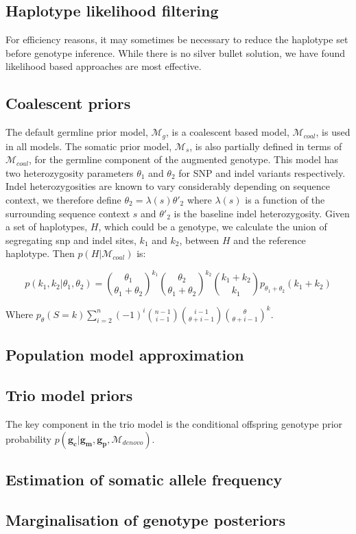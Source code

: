 \documentclass[notitlepage, twocolumn]{article}
\begin{document}
\subsection*{Haplotype likelihood filtering}

For efficiency reasons, it may sometimes be necessary to reduce the haplotype set before genotype inference. While there is no silver bullet solution, we have found likelihood based approaches are most effective.

\subsection*{Coalescent priors}

The default germline prior model, $\mathcal{M}_{g}$, is a coalescent based model, $\mathcal{M}_{coal}$, is used in all models. The somatic prior model, $\mathcal{M}_s$, is also partially defined in terms of $\mathcal{M}_{coal}$, for the germline component of the augmented genotype. This model has two heterozygosity parameters $\theta_{1}$ and $\theta_{2}$ for SNP and indel variants respectively. Indel heterozygosities are known to vary considerably depending on sequence context, we therefore define $\theta_{2} = \lambda(s) \theta'_{2}$ where $\lambda(s)$ is a function of the surrounding sequence context $s$ and $\theta'_{2}$ is the baseline indel heterozygosity. Given a set of haplotypes, $H$, which could be a genotype, we calculate the union of segregating snp and indel sites, $k_{1}$ and $k_{2}$, between $H$ and the reference haplotype. Then $p(H | \mathcal{M}_{coal})$ is:

\begin{equation*}
    p(k_{1}, k_{2} |  \theta_{1}, \theta_{2}) = \binom{\theta_{1}}{\theta_{1} + \theta_{2}}^{k_1} \binom{\theta_{2}}{\theta_{1} + \theta_{2}}^{k_{2}} \binom{k_{1} + k_{2}}{k_{1}} p_{\theta_{1} + \theta_{2}} (k_{1} + k_{2})
\end{equation*}

Where $p_\theta(S = k)\sum_{i=2}^n (-1)^i \binom{n - 1}{i - 1} \binom{i - 1}{\theta + i - 1} \binom{\theta}{\theta + i - 1}^k$.

\subsection*{Population model approximation}

\subsection*{Trio model priors}

The key component in the trio model is the conditional offspring genotype prior probability $p(\boldsymbol{g_c} | \boldsymbol{g_m}, \boldsymbol{g_p}, \mathcal{M}_{denovo})$. 

\subsection*{Estimation of somatic allele frequency}

\subsection*{Marginalisation of genotype posteriors}
\end{document}
